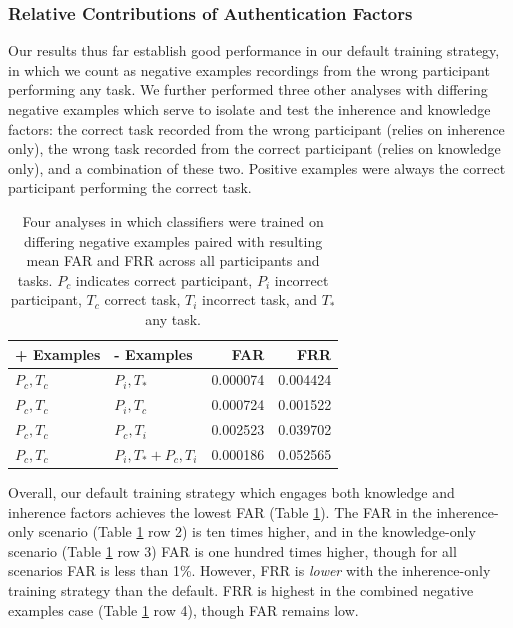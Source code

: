 \documentclass[a4paper,twoside]{article}
\begin{document}
\subsubsection{Relative Contributions of Authentication Factors}

\noindent Our results thus far establish good performance in our default training strategy, in which we count as negative examples recordings from the wrong participant performing any task. We further performed three other analyses with differing negative examples which serve to isolate and test the inherence and knowledge factors: the correct task recorded from the wrong participant (relies on inherence only), the wrong task recorded from the correct participant (relies on knowledge only), and a combination of these two. Positive examples were always the correct participant performing the correct task.

\begin{table}
\caption{Four analyses in which classifiers were trained on differing negative examples paired with resulting mean FAR and FRR across all participants and tasks. $P_c$ indicates correct participant, $P_i$ incorrect participant, $T_c$ correct task, $T_i$ incorrect task, and $T_*$ any task.}
\label{tab:compare}
\begin{center}
\begin{tabular}{llrr}
 \textbf{+ Examples} & \textbf{- Examples} & \textbf{FAR} & \textbf{FRR} \\
\hline
$P_c, T_c$ & $P_i, T_*$ & 0.000074 & 0.004424\\
$P_c, T_c$ & $P_i, T_c$ & 0.000724 & 0.001522\\
$P_c, T_c$ & $P_c, T_i$ & 0.002523 & 0.039702\\
$P_c, T_c$ & $P_i, T_* + P_c, T_i$ & 0.000186 & 0.052565\\
\hline
\end{tabular}
\end{center}
\end{table}

Overall, our default training strategy which engages both knowledge and inherence factors achieves the lowest FAR (Table \ref{tab:compare}). The FAR in the inherence-only scenario (Table \ref{tab:compare} row 2) is ten times higher, and in the knowledge-only scenario (Table \ref{tab:compare} row 3) FAR is one hundred times higher, though for all scenarios FAR is less than 1\%. However, FRR is \textit{lower} with the inherence-only training strategy than the default. FRR is highest in the combined negative examples case (Table \ref{tab:compare} row 4), though FAR remains low.
\end{document}
